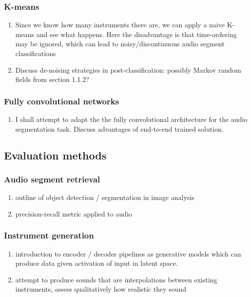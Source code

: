 \documentclass{article}[12pt]
\numberwithin{equation}{section}
\begin{document}
\subsubsection{K-means}

\begin{enumerate}
	\item Since we know how many instruments there are, we can apply a naive K-means
	and see what happens. Here the disadvantage is that time-ordering may be
	ignored, which can lead to noisy/discontinuous audio segment classifications
	\item Discuss de-noising strategies in post-classification: possibly Markov
	random fields from section 1.1.2?
\end{enumerate}

\subsubsection{Fully convolutional networks}
\begin{enumerate}
	\item I shall attempt to adapt the the fully convolutional architecture \cite{Long2015}
	for the audio segmentation task. Discuss advantages of end-to-end trained solution.
\end{enumerate}

\subsection{Evaluation methods}
\subsubsection{Audio segment retrieval}
\begin{enumerate}
	\item outline of object detection / segmentation in image analysis
	\item precision-recall metric applied to audio
\end{enumerate}
\subsubsection{Instrument generation}
\begin{enumerate}
	\item introduction to encoder / decoder pipelines as generative models which
	can produce data given activation of input in latent space.
	\item attempt to produce sounds that are interpolations between
	existing instruments, assess qualitatively how realistic they sound
\end{enumerate}
\end{document}
